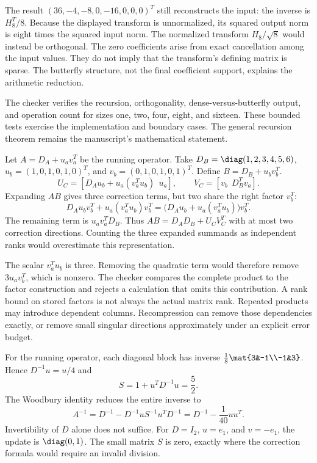 The result $(36,-4,-8,0,-16,0,0,0)^T$ still reconstructs the input: the inverse is $H_8^T/8$. Because the displayed transform is unnormalized, its squared output norm is eight times the squared input norm. The normalized transform $H_8/\sqrt8$ would instead be orthogonal.
The zero coefficients arise from exact cancellation among the input values. They do not imply that the transform's defining matrix is sparse. The butterfly structure, not the final coefficient support, explains the arithmetic reduction.

The checker verifies the recursion, orthogonality, dense-versus-butterfly output, and operation count for sizes one, two, four, eight, and sixteen. These bounded tests exercise the implementation and boundary cases. The general recursion theorem remains the manuscript's mathematical statement.

Let $A=D_A+u_av_a^T$ be the running operator. Take $D_B=\diag(1,2,3,4,5,6)$, $u_b=(1,0,1,0,1,0)^T$, and $v_b=(0,1,0,1,0,1)^T$. Define $B=D_B+u_bv_b^T$.
\[
U_C=[D_Au_b+u_a(v_a^Tu_b)\ \ u_a],\qquad
V_C=[v_b\ \ D_B^Tv_a].
\]
Expanding $AB$ gives three correction terms, but two share the right factor $v_b^T$:
\[
D_Au_bv_b^T+u_a(v_a^Tu_b)v_b^T
=\bigl(D_Au_b+u_a(v_a^Tu_b)\bigr)v_b^T.
\]
The remaining term is $u_av_a^TD_B$. Thus $AB=D_AD_B+U_CV_C^T$ with at most two correction directions. Counting the three expanded summands as independent ranks would overestimate this representation.

The scalar $v_a^Tu_b$ is three. Removing the quadratic term would therefore remove $3u_av_b^T$, which is nonzero. The checker compares the complete product to the factor construction and rejects a calculation that omits this contribution.
A rank bound on stored factors is not always the actual matrix rank. Repeated products may introduce dependent columns. Recompression can remove those dependencies exactly, or remove small singular directions approximately under an explicit error budget.

For the running operator, each diagonal block has inverse $\frac18\mat{3&-1\\-1&3}$. Hence $D^{-1}u=u/4$ and
\[
S=1+u^TD^{-1}u=\frac52.
\]
The Woodbury identity reduces the entire inverse to
\[
A^{-1}=D^{-1}-D^{-1}uS^{-1}u^TD^{-1}
=D^{-1}-\frac1{40}uu^T.
\]
Invertibility of $D$ alone does not suffice. For $D=I_2$, $u=e_1$, and $v=-e_1$, the update is $\diag(0,1)$. The small matrix $S$ is zero, exactly where the correction formula would require an invalid division.

